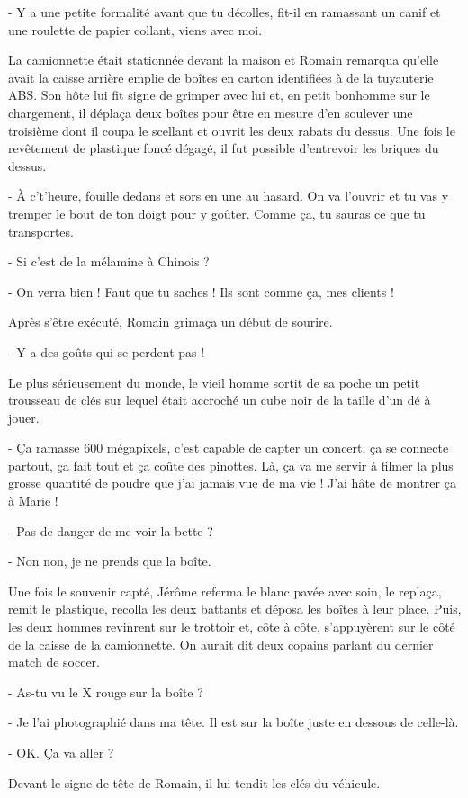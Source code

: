 - Y a une petite formalité avant que tu décolles, fit-il en ramassant un canif et une roulette de papier collant, viens avec moi.

La camionnette était stationnée devant la maison et Romain remarqua qu’elle avait la caisse arrière emplie de boîtes en carton identifiées à de la tuyauterie ABS. Son hôte lui fit signe de grimper avec lui et, en petit bonhomme sur le chargement, il déplaça deux boîtes pour être en mesure d’en soulever une troisième dont il coupa le scellant et ouvrit les deux rabats du dessus. Une fois le revêtement de plastique foncé dégagé, il fut possible d’entrevoir les briques du dessus.

- À c’t’heure, fouille dedans et sors en une au hasard. On va l’ouvrir et tu vas y tremper le bout de ton doigt pour y goûter. Comme ça, tu sauras ce que tu transportes.

- Si c’est de la mélamine à Chinois ?

- On verra bien ! Faut que tu saches ! Ils sont comme ça, mes clients !

Après s’être exécuté, Romain grimaça un début de sourire.

- Y a des goûts qui se perdent pas !

Le plus sérieusement du monde, le vieil homme sortit de sa poche un petit trousseau de clés sur lequel était accroché un cube noir de la taille d’un dé à jouer.

- Ça ramasse 600 mégapixels, c’est capable de capter un concert, ça se connecte partout, ça fait tout et ça coûte des pinottes. Là, ça va me servir à filmer la plus grosse quantité de poudre que j’ai jamais vue de ma vie ! J’ai hâte de montrer ça à Marie !

- Pas de danger de me voir la bette ?

- Non non, je ne prends que la boîte.

Une fois le souvenir capté, Jérôme referma le blanc pavée avec soin, le replaça, remit le plastique, recolla les deux battants et déposa les boîtes à leur place. Puis, les deux hommes revinrent sur le trottoir et, côte à côte, s’appuyèrent sur le côté de la caisse de la camionnette. On aurait dit deux copains parlant du dernier match de soccer.

- As-tu vu le X rouge sur la boîte ?

- Je l’ai photographié dans ma tête. Il est sur la boîte juste en dessous de celle-là.

- OK. Ça va aller ?

Devant le signe de tête de Romain, il lui tendit les clés du véhicule.


